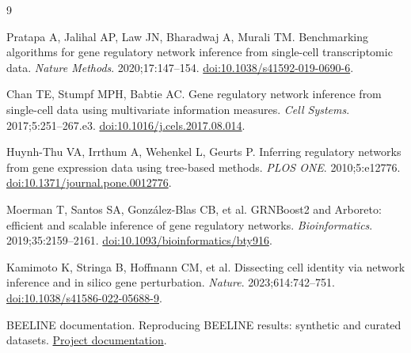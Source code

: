 \documentclass[11pt]{article}
\begin{document}
\clearpage

\begin{thebibliography}{9}

 Pratapa A, Jalihal AP, Law JN, Bharadwaj A, Murali TM. Benchmarking algorithms for gene regulatory network inference from single-cell transcriptomic data. \emph{Nature Methods}. 2020;17:147--154. \href{https://doi.org/10.1038/s41592-019-0690-6}{doi:10.1038/s41592-019-0690-6}.

 Chan TE, Stumpf MPH, Babtie AC. Gene regulatory network inference from single-cell data using multivariate information measures. \emph{Cell Systems}. 2017;5:251--267.e3. \href{https://doi.org/10.1016/j.cels.2017.08.014}{doi:10.1016/j.cels.2017.08.014}.

 Huynh-Thu VA, Irrthum A, Wehenkel L, Geurts P. Inferring regulatory networks from gene expression data using tree-based methods. \emph{PLOS ONE}. 2010;5:e12776. \href{https://doi.org/10.1371/journal.pone.0012776}{doi:10.1371/journal.pone.0012776}.

 Moerman T, Santos SA, Gonz\'{a}lez-Blas CB, et al. GRNBoost2 and Arboreto: efficient and scalable inference of gene regulatory networks. \emph{Bioinformatics}. 2019;35:2159--2161. \href{https://doi.org/10.1093/bioinformatics/bty916}{doi:10.1093/bioinformatics/bty916}.

 Kamimoto K, Stringa B, Hoffmann CM, et al. Dissecting cell identity via network inference and in silico gene perturbation. \emph{Nature}. 2023;614:742--751. \href{https://doi.org/10.1038/s41586-022-05688-9}{doi:10.1038/s41586-022-05688-9}.

 BEELINE documentation. Reproducing BEELINE results: synthetic and curated datasets. \href{https://murali-group.github.io/Beeline/reproducing-results.html}{Project documentation}.

\end{thebibliography}
\end{document}
